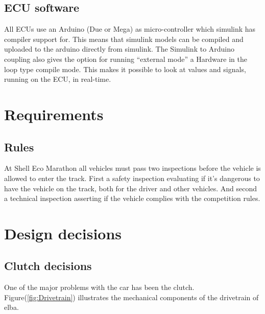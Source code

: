 \subsection{ECU software}
All ECUs use an Arduino (Due or Mega) as micro-controller which simulink has
compiler support for. This means that simulink models can be compiled and
uploaded to the arduino directly from simulink. The Simulink to Arduino coupling also
gives the option for running ``external mode'' a Hardware in the loop type compile mode.
This makes it possible to look at values and signals, running on the ECU, in
real-time.
 
\section{Requirements}
\subsection{Rules}
At Shell Eco Marathon all vehicles must pass two inspections before the vehicle is allowed to enter the track. First a safety inspection evaluating if it's dangerous to have the vehicle on the track, both for the driver and other vehicles. And second a technical inspection asserting if the vehicle complies with the competition rules.

\section{Design decisions}
\subsection{Clutch decisions}

One of the major problems with the car has been the clutch. Figure(\ref{fig:Drivetrain}) illustrates the mechanical components of the drivetrain of elba.

